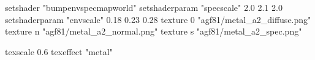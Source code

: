 setshader "bumpenvspecmapworld"
setshaderparam "specscale" 2.0 2.1 2.0
setshaderparam "envscale"  0.18 0.23 0.28
   texture 0 "agf81/metal_a2_diffuse.png"
   texture n "agf81/metal_a2_normal.png"
   texture s "agf81/metal_a2_spec.png"

texscale 0.6
texeffect "metal"
